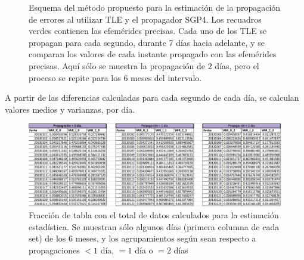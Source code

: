 \begin{figure}[!h]
\centering
{}
\caption[Descripci\'on del m\'etodo propuesto para la propagaci\'on de errores]{Esquema del m\'etodo propuesto para la estimaci\'on de la propagaci\'on de errores al utilizar TLE y el propagador SGP4. Los recuadros verdes contienen las efem\'erides precisas. Cada uno de los TLE se propagan para cada segundo, durante 7 d\'ias hacia adelante, y se comparan los valores de cada instante propagado con las efem\'erides precisas. Aqu\'i s\'olo se muestra la propagaci\'on de 2 d\'ias, pero el proceso se repite para los 6 meses del intervalo.}
\label{fig:metodotabla}
\end{figure}

A partir de las diferencias calculadas para cada segundo de cada d\'ia, se calculan valores medios y varianzas, por d\'ia.\\


\begin{figure}[!h]
\centering
\includegraphics[width=\textwidth]{imagenes/tablacompleta}
\caption[Tabla de Estimaci\'on de errores.]{Fracci\'on de tabla con el total de datos calculados para la estimaci\'on estad\'istica. Se muestran s\'olo algunos d\'ias (primera columna de cada set) de los 6 meses, y los agrupamientos seg\'un sean respecto a propagaciones $< 1$ d\'ia, $= 1$ d\'ia o $= 2$ d\'ias}
\label{fig:tablacompleta}
\end{figure}

